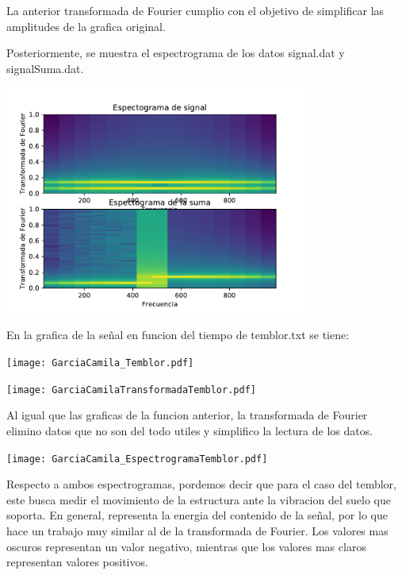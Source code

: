\documentclass[11pt,letterpaper]{exam}
\begin{document}
La anterior transformada de Fourier cumplio con el objetivo de simplificar las amplitudes de la grafica original.

Posteriormente, se muestra el espectrograma de los datos signal.dat y signalSuma.dat.

\begin{center}
\includegraphics[width=10cm]{GarciaCamila_Espectrogramas.pdf}
\end{center}

En la grafica de la señal en funcion del tiempo de temblor.txt se tiene:

\begin{center}
\texttt{[image: GarciaCamila\_Temblor.pdf]}
\end{center}

\begin{center}
\texttt{[image: GarciaCamilaTransformadaTemblor.pdf]}
\end{center}

Al igual que las graficas de la funcion anterior, la transformada de Fourier elimino datos que no son del todo utiles y simplifico la lectura de los datos.

\begin{center}
\texttt{[image: GarciaCamila\_EspectrogramaTemblor.pdf]}
\end{center}

Respecto a ambos espectrogramas, pordemos decir que para el caso del temblor, este busca medir el movimiento de la estructura ante la vibracion del suelo que soporta. En general, representa la energia del contenido de la señal, por lo que hace un trabajo muy similar al de la transformada de Fourier. Los valores mas oscuros representan un valor negativo, mientras que los valores mas claros representan valores positivos.


\noindent
\end{document}
